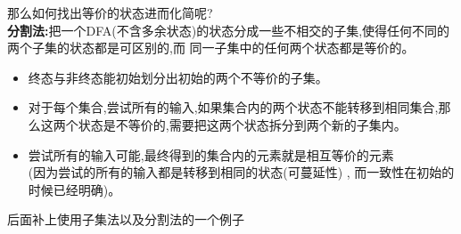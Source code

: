 \documentclass[UTF8,a4paper]{ctexart}
\newcommand{\spaceline}{\vspace{\baselineskip}}
\begin{document}
  \spaceline
  那么如何找出等价的状态进而化简呢?\\
  \textbf{分割法:}把一个DFA(不含多余状态)的状态分成一些不相交的子集,使得任何不同的两个子集的状态都是可区别的,而
  同一子集中的任何两个状态都是等价的。

  \begin{itemize}
    \item 终态与非终态能初始划分出初始的两个不等价的子集。
    \item 对于每个集合,尝试所有的输入,如果集合内的两个状态不能转移到相同集合,那么这两个状态是不等价的,需要把这两个状态拆分到两个新的子集内。
    \item 尝试所有的输入可能,最终得到的集合内的元素就是相互等价的元素\\
    (因为尝试的所有的输入都是转移到相同的状态(可蔓延性) , 而一致性在初始的时候已经明确)。
  \end{itemize}

  {\color{red} 后面补上使用子集法以及分割法的一个例子}
\end{document}
